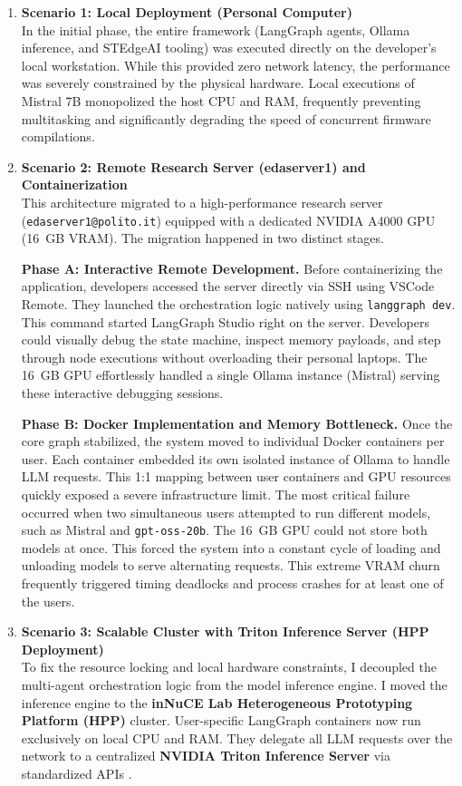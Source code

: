 \begin{enumerate}
    \item \textbf{Scenario 1: Local Deployment (Personal Computer)}\\
          In the initial phase, the entire framework (LangGraph agents, Ollama inference, and STEdgeAI tooling) was executed directly on the developer's local workstation. While this provided zero network latency, the performance was severely constrained by the physical hardware. Local executions of Mistral 7B monopolized the host CPU and RAM, frequently preventing multitasking and significantly degrading the speed of concurrent firmware compilations.

    \item \textbf{Scenario 2: Remote Research Server (edaserver1) and Containerization}\\
          This architecture migrated to a high-performance research server (\texttt{edaserver1@polito.it}) equipped with a dedicated NVIDIA A4000 GPU (16~GB VRAM). The migration happened in two distinct stages.

          \textbf{Phase A: Interactive Remote Development.} Before containerizing the application, developers accessed the server directly via SSH using VSCode Remote. They launched the orchestration logic natively using \texttt{langgraph dev}. This command started LangGraph Studio right on the server. Developers could visually debug the state machine, inspect memory payloads, and step through node executions without overloading their personal laptops. The 16~GB GPU effortlessly handled a single Ollama instance (Mistral) serving these interactive debugging sessions.

          \textbf{Phase B: Docker Implementation and Memory Bottleneck.} Once the core graph stabilized, the system moved to individual Docker containers per user. Each container embedded its own isolated instance of Ollama to handle LLM requests. This 1:1 mapping between user containers and GPU resources quickly exposed a severe infrastructure limit. The most critical failure occurred when two simultaneous users attempted to run different models, such as Mistral and \texttt{gpt-oss-20b}. The 16~GB GPU could not store both models at once. This forced the system into a constant cycle of loading and unloading models to serve alternating requests. This extreme VRAM churn frequently triggered timing deadlocks and process crashes for at least one of the users.

    \item \textbf{Scenario 3: Scalable Cluster with Triton Inference Server (HPP Deployment)}\\
          To fix the resource locking and local hardware constraints, I decoupled the multi-agent orchestration logic from the model inference engine. I moved the inference engine to the \textbf{inNuCE Lab Heterogeneous Prototyping Platform (HPP)} cluster. User-specific LangGraph containers now run exclusively on local CPU and RAM. They delegate all LLM requests over the network to a centralized \textbf{NVIDIA Triton Inference Server} via standardized APIs \cite{nvidia_triton_docs}.


\end{enumerate}
